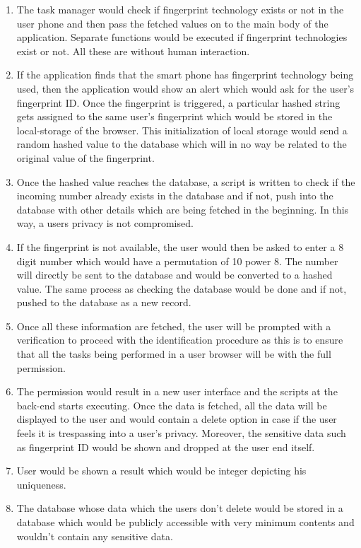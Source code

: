 \documentclass[journal]{IEEEtran}
\begin{document}
\begin{enumerate}
  \item The task manager would check if fingerprint technology exists or not in the user phone and then pass the fetched values on to the main body of the application. Separate
  functions would be executed if fingerprint technologies exist or not. All these are without human
  interaction.
  \item If the application finds that the smart phone has fingerprint technology being used, then the application would show an alert which would ask for the user's fingerprint ID. Once the fingerprint is triggered, a particular hashed string gets assigned to the same user's fingerprint which would be stored in the local-storage of the browser. This initialization of local storage would send a random hashed value to the database which will in no way be related to the original value of the fingerprint. 
  \item Once the hashed value reaches the database, a script is written to check if the incoming number already exists in the database and if not, push into the database with other details which are being fetched in the beginning. In this way, a users privacy is not compromised.
  \item If the fingerprint is not available, the user would then be asked to enter a 8 digit number which would have a permutation of 10 power 8. The number will directly be sent to the database and would be converted to a hashed value. The same process as checking the database would be done and if not, pushed to the database as a new record.
  \item Once all these information are fetched, the user will be prompted with a
  verification to proceed with the identification procedure as this is to ensure that all the tasks being performed in a user browser will be with the full permission. 
  \item The permission would result in a new user interface and the scripts at the back-end starts
  executing. Once the data is fetched, all the data will be displayed to the user and
  would contain a delete option in case if the user feels it is trespassing into a user's
  privacy. Moreover, the sensitive data such as fingerprint ID would be shown and dropped at the user end itself.
  \item User would be shown a result which would be integer depicting his uniqueness. 
  \item The database whose data which the users don't delete would be stored in a database which would
  be publicly accessible with very minimum contents and wouldn't contain any sensitive data.
\end{enumerate}
\end{document}
